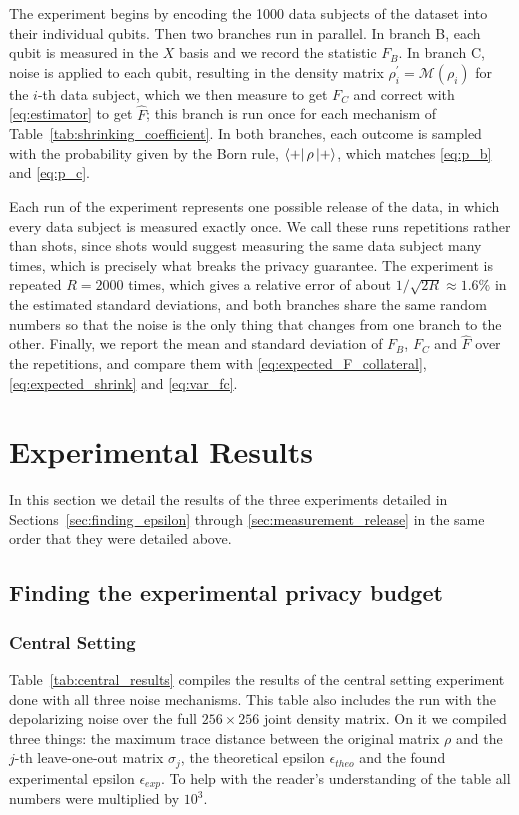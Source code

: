 \documentclass{ieeeaccess}
\begin{document}
The experiment begins by encoding the 1000 data subjects of the dataset into their individual qubits. Then two branches run in parallel. In branch B, each qubit is measured in the $X$ basis and we record the statistic $F_B$. In branch C, noise is applied to each qubit, resulting in the density matrix $\rho_i^{\prime} = \mathcal{M}(\rho_i)$ for the $i$-th data subject, which we then measure to get $F_C$ and correct with \eqref{eq:estimator} to get $\hat{F}$; this branch is run once for each mechanism of Table~\ref{tab:shrinking_coefficient}. In both branches, each outcome is sampled with the probability given by the Born rule, $\bra{+}\rho\ket{+}$, which matches \eqref{eq:p_b} and \eqref{eq:p_c}.

Each run of the experiment represents one possible release of the data, in which every data subject is measured exactly once. We call these runs repetitions rather than shots, since shots would suggest measuring the same data subject many times, which is precisely what breaks the privacy guarantee. The experiment is repeated $R = 2000$ times, which gives a relative error of about $1/\sqrt{2R} \approx 1.6\%$ in the estimated standard deviations, and both branches share the same random numbers so that the noise is the only thing that changes from one branch to the other. Finally, we report the mean and standard deviation of $F_B$, $F_C$ and $\hat{F}$ over the repetitions, and compare them with \eqref{eq:expected_F_collateral}, \eqref{eq:expected_shrink} and \eqref{eq:var_fc}.

\section{Experimental Results}
\label{sec:experimental_results}

In this section we detail the results of the three experiments detailed in Sections~\ref{sec:finding_epsilon} through \ref{sec:measurement_release} in the same order that they were detailed above.

\subsection{Finding the experimental privacy budget}

\subsubsection{Central Setting}
\label{subsubsec:central_results}

Table~\ref{tab:central_results} compiles the results of the central setting experiment done with all three noise mechanisms. This table also includes the run with the depolarizing noise over the full $256 \times 256$ joint density matrix. On it we compiled three things: the maximum trace distance between the original matrix $\rho$ and the $j$-th leave-one-out matrix $\sigma_j$, the theoretical epsilon $\epsilon_{theo}$ and the found experimental epsilon $\epsilon_{exp}$. To help with the reader's understanding of the table all numbers were multiplied by $10^{3}$.
\end{document}
